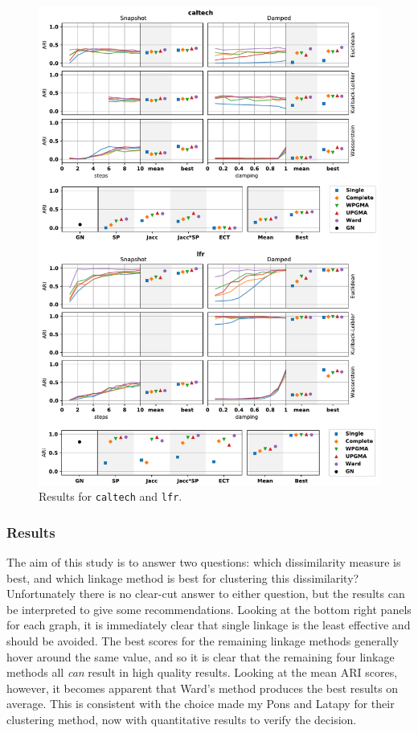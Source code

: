 \begin{figure}
    \centering
    \includegraphics[height=.95\textheight]{power/ARI2.pdf}
    \caption[Experimental clustering results for \texttt{caltech} and \texttt{lfr}]{Results for \texttt{caltech} and \texttt{lfr}.}
    \label{fig:ARI2}
\end{figure}

\subsubsection{Results}
The aim of this study is to answer two questions: which dissimilarity measure is best, and which linkage method is best for clustering this dissimilarity?
Unfortunately there is no clear-cut answer to either question, but the results can be interpreted to give some recommendations. Looking at the bottom right panels for each graph, it is immediately clear that single linkage is the least effective and should be avoided. The best scores for the remaining linkage methods generally hover around the same value, and so it is clear that the remaining four linkage methods all \emph{can} result in high quality results. Looking at the mean ARI scores, however, it becomes apparent that Ward's method produces the best results on average. This is consistent with the choice made my Pons and Latapy \cite{Pons2006} for their clustering method, now with quantitative results to verify the decision.

